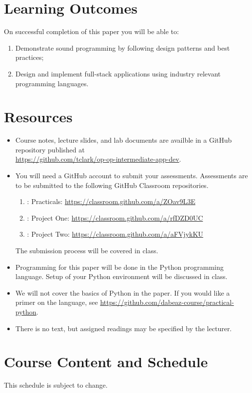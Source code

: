 \documentclass{article}
\begin{document}
\newpage 

\section*{Learning Outcomes}
On successful completion of this paper you will be able to:
\begin{enumerate}
  \item Demonstrate sound programming by following design patterns and best practices;
  \item Design and implement full-stack applications using industry relevant programming languages.
\end{enumerate}

\section*{Resources}
\begin{itemize}
	\item Course notes, lecture slides, and lab documents are availble in a GitHub repository published at \\ \url{https://github.com/tclark/op-op-intermediate-app-dev}.
	\item You will need a GitHub account to submit your assessments. Assessments are to be submitted to the following GitHub Classroom repositories.
	  \begin{enumerate}
	    \item: Practicals: \url{https://classroom.github.com/a/ZOav9L3E}
	    \item: Project One: \url{https://classroom.github.com/a/rfDZD0UC}
	    \item: Project Two: \url{https://classroom.github.com/a/aFVjykKU}
	  \end{enumerate}
	  The submission process will be covered in class.
	\item Programming for this paper will be done in the Python programming language. Setup of your Python environment will be discussed in class. 
	\item We will not cover the basics of Python in the paper. If you would like a primer on the language, see \url{https://github.com/dabeaz-course/practical-python}.
	\item There is no text, but assigned readings may be specified by the lecturer.     
\end{itemize}

\pagebreak

\section*{Course Content and Schedule}
This schedule is subject to change.
\end{document}
